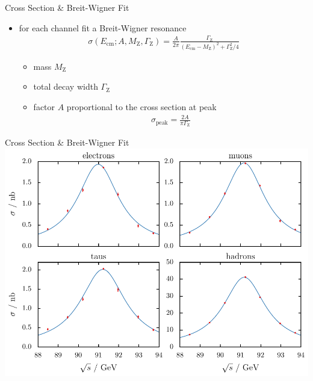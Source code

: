 \documentclass[11pt,xcolor=dvipsnames,professionalfonts]{beamer}
\begin{document}
\begin{frame}{Cross Section \& Breit-Wigner Fit}
	\begin{itemize}
		\setlength\itemsep{1.5em}
		
		\item for each channel fit a Breit-Wigner resonance
			\begin{align*}
			\sigma(E_\mathrm{cm}; A, M_\mathrm{Z}, \Gamma_\mathrm{Z}) = \frac{A}{2\pi} \frac{\Gamma_\mathrm{Z}}{\left( E_\mathrm{cm} - M_\mathrm{Z} \right)^2 + \Gamma_\mathrm{Z}^2 / 4}
			\end{align*}
			
			\begin{itemize}
				\setlength\itemsep{.5em}
				\item mass $M_\mathrm{Z}$
				\item total decay width $\Gamma_\mathrm{Z}$
				\item factor $A$ proportional to the cross section at peak
				\begin{align*}
					\sigma_\mathrm{peak} = \frac{2A}{\pi \Gamma_\mathrm{Z}}
				\end{align*}
			\end{itemize}
		
	\end{itemize}
\end{frame}

\begin{frame}{Cross Section \& Breit-Wigner Fit}
	\centering
	\includegraphics[height=0.9\textheight]{./talkfigs/pdf/cross_sections.pdf}
\end{frame}
\end{document}
